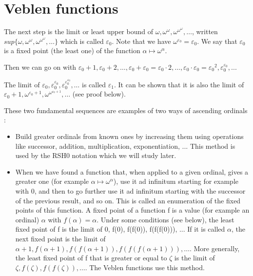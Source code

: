 \documentclass[10pt]{article}
\begin{document}
\section{Veblen functions}

The next step is the limit or least upper bound of \( \omega, \omega^\omega, \omega^{\omega^\omega}, \ldots \), written \( sup \lbrace \omega, \omega^\omega, \omega^{\omega^\omega}, \ldots \rbrace \) which is called \( \varepsilon_0 \). Note that we have \( \omega^{\varepsilon_0} = \varepsilon_0 \). We say that \( \varepsilon_0 \) is a fixed point (the least one) of the function \( \alpha \mapsto \omega^\alpha \).

Then we can go on with \( \varepsilon_0+1, \varepsilon_0+2, \ldots, \varepsilon_0+\varepsilon_0 = \varepsilon_0 \cdot 2, \ldots, \varepsilon_0 \cdot \varepsilon_0 = {\varepsilon_0}^2, \varepsilon_0^{\varepsilon_0}, ...\)

The limit of \( \varepsilon_0, \varepsilon_0^{\varepsilon_0}, \varepsilon_0^{\varepsilon_0^{\varepsilon_0}}, \ldots \) is called \( \varepsilon_1 \). It can be shown that it is also the limit of \( \varepsilon_0+1, \omega^{\varepsilon_0+1}, \omega^{\omega^{\varepsilon_0+1}}, \ldots \) (see proof below).

These two fundamental sequences are examples of two ways of ascending ordinals :
\begin{itemize}
     \setlength{\itemsep}{1pt}
     \setlength{\parskip}{0pt}
     \setlength{\parsep}{0pt}
\item Build greater ordinals from known ones by increasing them using operations like successor, addition, multiplication, exponentiation, ... This method is used by the RSH0 notation which we will study later.

\item When we have found a function that, when applied to a given ordinal, gives a greater one (for example \( \alpha \mapsto \omega^\alpha \)), use it ad infinitum starting for example with 0, and then to go further use it ad infinitum starting with the successor of the previous result, and so on. This is called an enumeration of the fixed points of this function. A fixed point of a function f is a value (for example an ordinal) \( \alpha \) with \( f(\alpha) = \alpha \). Under some conditions (see below), the least fixed point of f is the limit of 0, f(0), f(f(0)), f(f(f(0))), ... If it is called \( \alpha \), the next fixed point is the limit of \( \alpha+1, f(\alpha+1), f(f(\alpha+1)), f(f(f(\alpha+1))), \ldots \).
More generally, the least fixed point of f that is greater or equal to \( \zeta \) is the limit of \( \zeta, f(\zeta), f(f(\zeta)), \ldots\).
The Veblen functions use this method.

\end{itemize}
\end{document}
